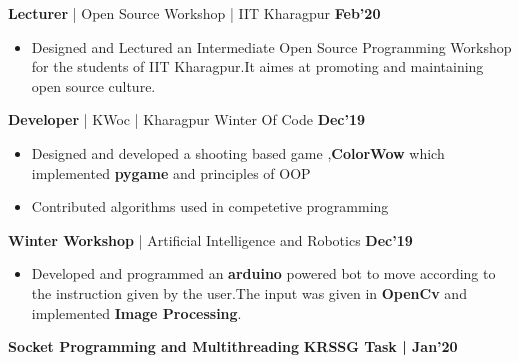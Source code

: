 \documentclass[10pt]{article}
\begin{document}
\large { \textbf{Lecturer} | Open Source Workshop |  IIT Kharagpur} \normalsize
{\hfill} \textbf{Feb'20}\\[-1.9em]
\begin{itemize}
    \item Designed and Lectured an Intermediate Open Source Programming Workshop for the students of IIT Kharagpur.It aimes at promoting and maintaining open source culture.  \\[-1.5em]
\end{itemize}
\large { \textbf {Developer} | {KWoc} | Kharagpur Winter Of Code} \normalsize
{\hfill} \textbf{Dec'19}\\[-1.9em]
\begin{itemize}
    \item Designed and developed a shooting based game ,\textbf{ColorWow} which implemented \textbf{pygame} and principles of OOP    \href{https://github.com/yashica-patodia/ColorWow_Pygame1} {\hspace{0.5ex}\footnotesize\faMousePointer} {\hfill}\\[-2em]
    \item Contributed algorithms used in competetive programming \href{https://github.com/yashica-patodia/Competitive-Programming} {\hspace{0.5ex}\footnotesize\faMousePointer} {\hfill}\\[-1.5em]
\end{itemize}
\large { \textbf {Winter Workshop} | Artificial Intelligence and Robotics} \normalsize
{\hfill} \textbf{Dec'19}\\[-1.9em]
\begin{itemize}
    \item Developed and programmed an \textbf{arduino} powered bot  to move according to the instruction given by the user.The input was given in \textbf{OpenCv} and implemented \textbf{Image Processing}. \href{https://docs.google.com/document/d/e/2PACX-1vSzxl9OEtG4bDKWT6oOnZ--oQIr6fdvWNlqc_YvSWjsu6-ABByufZwWi_B4iLdE5d_NjTcHsyaXreFw/pub} {\hspace{0.5ex}\footnotesize\faMousePointer} {\hfill}\\[-1.5em]
\end{itemize}
\vspace{-2.5ex}
\spacedhrule{0.15ex}{1.0ex}
\large {\textbf{Socket Programming and Multithreading}} \normalsize  \href{https://github.com/yashica-patodia/krssg_task/tree/master} {\hspace{0.5ex}\faGithub} {\hfill} \textbf{ KRSSG Task | Jan'20}\\[-1.75em]
\end{document}
